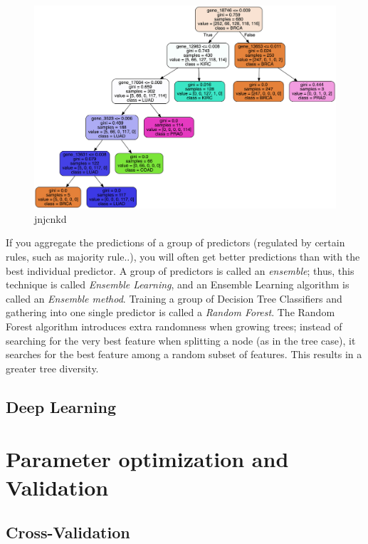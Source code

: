 \documentclass[%
 reprint,
 amsmath,amssymb,
 aps,
]{revtex4-1}
\begin{document}
\begin{figure}
\centering
\includegraphics[width=\linewidth]{img/tree_best.png}
\caption{jnjcnkd}
\label{fig1}
\end{figure}

If you aggregate the predictions of a group of predictors (regulated by certain rules, such as majority rule..), you will often get better predictions than with the best individual predictor. A group of predictors is called an \textit{ensemble}; thus, this technique is called \textit{Ensemble Learning}, and an Ensemble Learning algorithm is called an \textit{Ensemble method}.
Training a group of Decision Tree Classifiers and gathering into one single predictor is called a \textit{Random Forest}.
The Random Forest algorithm introduces extra randomness when growing trees; instead of searching for the very best feature when splitting a node (as in the tree case), it searches for the best feature among a random subset of features. This results in a greater tree diversity.



\subsection{\label{sec:level2}Deep Learning}




\section{\label{sec:level1}Parameter optimization and Validation}

\subsection{\label{sec:level2}Cross-Validation}
\end{document}
